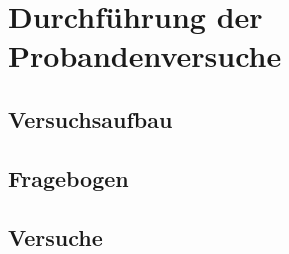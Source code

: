 
\chapter{Durchführung  der Probandenversuche} 
\todo{} 
\section{Versuchsaufbau} 

\section{Fragebogen} 

\section{Versuche}
